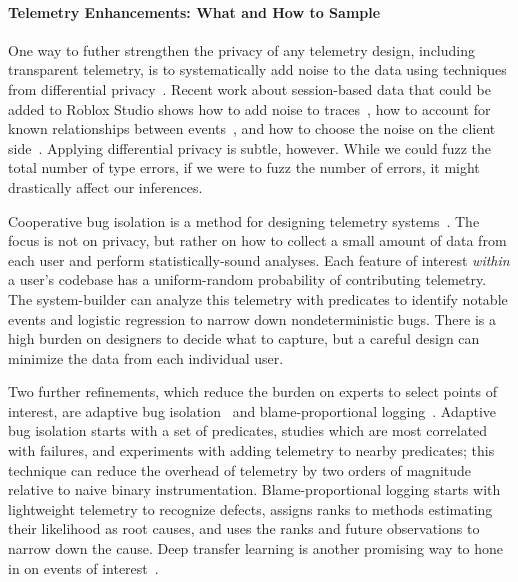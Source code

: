 \documentclass[english,submission,cleveref]{programming}
\begin{document}
\paragraph{Telemetry Enhancements: What and How to Sample}

One way to futher strengthen the privacy of any telemetry design, including
transparent telemetry, is to systematically add noise to the data using
techniques from differential
privacy~\cite{zhlbr-cc-2020,epk-ccs-2014,wblj-usenix-2017}.
Recent work about session-based data that could be added
to Roblox Studio shows how to add noise to traces~\cite{zhlbr-cc-2020},
how to account for known relationships between events~\cite{zhlbr-oopsla-2020},
and how to choose the noise on the client side~\cite{hlzbr-ecoop-2021}.
Applying differential privacy is subtle, however.
While we could fuzz the total number of type errors, if we were to
fuzz the number of  errors, it might drastically
affect our inferences.

Cooperative bug isolation is a method for designing
telemetry systems~\cite{liblit-thesis}.
The focus is not on privacy, but rather on how to collect a small amount of
data from each user and perform statistically-sound analyses.
Each feature of interest \emph{within} a user's codebase has a uniform-random
probability of contributing telemetry.
The system-builder can analyze this telemetry with predicates to identify
notable events and logistic regression to narrow down nondeterministic bugs.
There is a high burden on designers to decide what to capture,
but a careful design can minimize the data from each individual user.

Two further refinements, which reduce the burden on experts to
select points of interest, are adaptive bug isolation~\cite{nl-icse-2010}
and blame-proportional logging~\cite{lnsmc-usenix-2018}.
Adaptive bug isolation starts with a set of predicates, studies which are
most correlated with failures, and experiments with adding telemetry to nearby
predicates; this technique can reduce the overhead of telemetry by two orders
of magnitude relative to naive binary instrumentation.
Blame-proportional logging starts with lightweight telemetry to recognize
defects, assigns ranks to methods estimating their likelihood as root causes,
and uses the ranks and future observations to narrow down the cause.
Deep transfer learning is another promising way to hone in on events of
interest~\cite{zfstt-ieeesensors-2022}.
\end{document}
